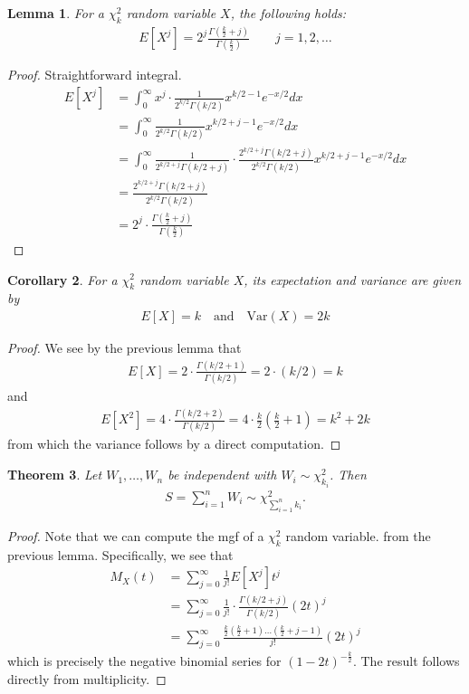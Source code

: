 \documentclass[11pt]{amsart}
\newtheorem{theorem}{Theorem}[section]
\newtheorem{lemma}[theorem]{Lemma}
\newtheorem{corollary}[theorem]{Corollary}
\theoremstyle{definition}
\numberwithin{equation}{section}
\begin{document}
\begin{lemma}
    For a $\chi_k^2$ random variable $X$, the following holds:
    \begin{align*}
        E[X^j]=2^j\frac{\Gamma(\frac{k}{2}+j)}{\Gamma(\frac{k}{2})}\qquad j=1,2,\ldots
    \end{align*}
\end{lemma}
\begin{proof}
    Straightforward integral.
    \begin{align*}
        E[X^j]&=\int_0^\infty x^j\cdot\frac{1}{2^{k/2}\Gamma(k/2)}x^{k/2-1}e^{-x/2}dx\\
        &=\int_0^\infty\frac{1}{2^{k/2}\Gamma(k/2)}x^{k/2+j-1}e^{-x/2}dx\\
        &=\int_0^\infty\frac{1}{2^{k/2+j}\Gamma(k/2+j)}\cdot\frac{2^{k/2+j}\Gamma(k/2+j)}{2^{k/2}\Gamma(k/2)}x^{k/2+j-1}e^{-x/2}dx\\
        &=\frac{2^{k/2+j}\Gamma(k/2+j)}{2^{k/2}\Gamma(k/2)}\\
        &=2^j\cdot\frac{\Gamma(\frac{k}{2}+j)}{\Gamma(\frac{k}{2})}
    \end{align*}
\end{proof}
\begin{corollary}
    For a $\chi_k^2$ random variable $X$, its expectation and variance are given by
    \begin{align*}
        E[X]=k\quad\text{and}\quad \mathrm{Var}(X)=2k
    \end{align*}
\end{corollary}
\begin{proof}
    We see by the previous lemma that 
    \begin{align*}
        E[X]=2\cdot\frac{\Gamma(k/2+1)}{\Gamma(k/2)}=2\cdot(k/2)=k
    \end{align*}
    and
    \begin{align*}
        E[X^2]=4\cdot\frac{\Gamma(k/2+2)}{\Gamma(k/2)}=4\cdot\frac{k}{2}(\frac{k}{2}+1)=k^2+2k
    \end{align*}
    from which the variance follows by a direct computation.
\end{proof}
\begin{theorem}
    Let $W_1,\ldots,W_n$ be independent with $W_i\sim \chi^2_{k_i}$. Then 
    \begin{align*}
        S=\sum_{i=1}^nW_i\sim\chi_{\sum_{i=1}^nk_i}^2.
    \end{align*}
\end{theorem}
\begin{proof}
    Note that we can compute the mgf of a $\chi_k^2$ random variable. from the previous lemma. Specifically, we see that
    \begin{align*}
        M_X(t)&=\sum_{j=0}^\infty \frac{1}{j!}E[X^j]t^j\\
        &=\sum_{j=0}^\infty\frac{1}{j!}\cdot\frac{\Gamma(k/2+j)}{\Gamma(k/2)}(2t)^j\\
        &=\sum_{j=0}^\infty\frac{\frac{k}{2}(\frac{k}{2}+1)\ldots(\frac{k}{2}+j-1)}{j!}(2t)^j
    \end{align*}
    which is precisely the negative binomial series for $(1-2t)^{-\frac{k}{2}}$. The result follows directly from multiplicity.
\end{proof}
\end{document}
